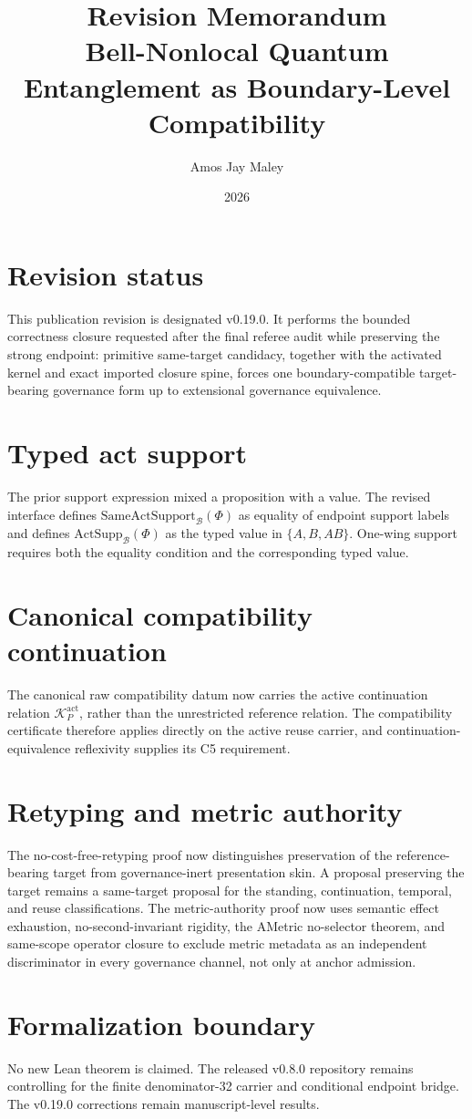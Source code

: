 \documentclass[11pt]{article}
\title{Revision Memorandum\\\large Bell-Nonlocal Quantum Entanglement as Boundary-Level Compatibility}
\author{Amos Jay Maley}
\date{2026}
\begin{document}
\maketitle

\section*{Revision status}
This publication revision is designated v0.19.0. It performs the bounded correctness closure requested after the final referee audit while preserving the strong endpoint: primitive same-target candidacy, together with the activated kernel and exact imported closure spine, forces one boundary-compatible target-bearing governance form up to extensional governance equivalence.

\section*{Typed act support}
The prior support expression mixed a proposition with a value. The revised interface defines \(\mathrm{SameActSupport}_{\mathcal B}(\Phi)\) as equality of endpoint support labels and defines \(\mathrm{ActSupp}_{\mathcal B}(\Phi)\) as the typed value in \(\{A,B,AB\}\). One-wing support requires both the equality condition and the corresponding typed value.

\section*{Canonical compatibility continuation}
The canonical raw compatibility datum now carries the active continuation relation \(\mathcal K_P^{\mathrm{act}}\), rather than the unrestricted reference relation. The compatibility certificate therefore applies directly on the active reuse carrier, and continuation-equivalence reflexivity supplies its C5 requirement.

\section*{Retyping and metric authority}
The no-cost-free-retyping proof now distinguishes preservation of the reference-bearing target from governance-inert presentation skin. A proposal preserving the target remains a same-target proposal for the standing, continuation, temporal, and reuse classifications. The metric-authority proof now uses semantic effect exhaustion, no-second-invariant rigidity, the AMetric no-selector theorem, and same-scope operator closure to exclude metric metadata as an independent discriminator in every governance channel, not only at anchor admission.

\section*{Formalization boundary}
No new Lean theorem is claimed. The released v0.8.0 repository remains controlling for the finite denominator-32 carrier and conditional endpoint bridge. The v0.19.0 corrections remain manuscript-level results.
\end{document}
